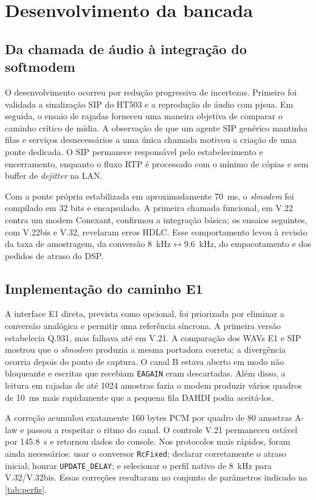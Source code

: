 \documentclass[12pt,a4paper]{article}
\newcommand{\slmodem}{\textit{slmodem}}
\begin{document}
\section{Desenvolvimento da bancada}

\subsection{Da chamada de áudio à integração do softmodem}

O desenvolvimento ocorreu por redução progressiva de incertezas. Primeiro foi
validada a sinalização SIP do HT503 e a reprodução de áudio com pjsua. Em seguida,
o ensaio de rajadas forneceu uma maneira objetiva de comparar o caminho crítico de
mídia. A observação de que um agente SIP genérico mantinha filas e serviços
desnecessários a uma única chamada motivou a criação de uma ponte dedicada. O SIP
permanece responsável pelo estabelecimento e encerramento, enquanto o fluxo RTP é
processado com o mínimo de cópias e sem buffer de \emph{dejitter} na LAN.

Com a ponte própria estabilizada em aproximadamente \SI{70}{ms}, o \slmodem{} foi
compilado em 32 bits e encapsulado. A primeira chamada funcional, em V.22 contra
um modem Conexant, confirmou a integração básica; os ensaios seguintes, com V.22bis
e V.32, revelaram erros HDLC. Esse comportamento levou à revisão da taxa de
amostragem, da conversão
\SI{8}{kHz}$\leftrightarrow$\SI{9.6}{kHz}, do empacotamento e dos pedidos de atraso
do DSP.

\subsection{Implementação do caminho E1}

A interface E1 direta, prevista como opcional, foi priorizada por eliminar a
conversão analógica e permitir uma referência síncrona. A primeira versão estabelecia
Q.931, mas falhava até em V.21. A comparação dos WAVs E1 e SIP mostrou que o
\slmodem{} produzia a mesma portadora correta; a divergência ocorria depois do ponto
de captura. O canal B estava aberto em modo não bloqueante e escritas que recebiam
\texttt{EAGAIN} eram descartadas. Além disso, a leitura em rajadas de até 1024
amostras fazia o modem produzir vários quadros de \SI{10}{ms} mais rapidamente que
a pequena fila DAHDI podia aceitá-los.

A correção acumulou exatamente 160 bytes PCM por quadro de 80 amostras A-law e
passou a respeitar o ritmo do canal. O controle V.21 permaneceu estável por
\SI{145.8}{s} e retornou dados do console. Nos protocolos mais rápidos, foram ainda
necessários: usar o conversor \texttt{RcFixed}; declarar corretamente o atraso
inicial; honrar \texttt{UPDATE\_DELAY}; e selecionar o perfil nativo de \SI{8}{kHz}
para V.32/V.32bis. Essas correções resultaram no conjunto de parâmetros indicado
na \cref{tab:perfis}.
\end{document}
